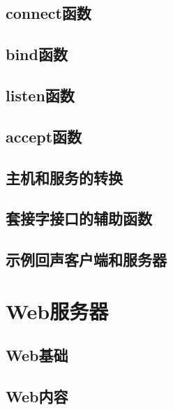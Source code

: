\pending

\subsection{connect函数}

\pending

\subsection{bind函数}

\pending

\subsection{listen函数}

\pending

\subsection{accept函数}

\pending

\subsection{主机和服务的转换}

\pending

\subsection{套接字接口的辅助函数}

\pending

\subsection{示例回声客户端和服务器}

\pending

\section{Web服务器}

\pending

\subsection{Web基础}

\pending

\subsection{Web内容}


